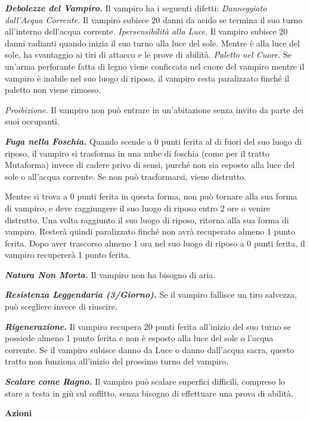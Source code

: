 \begin{multicols}{2}
\emph{\textbf{Debolezze del Vampiro.}} Il vampiro ha i seguenti difetti:
\emph{Danneggiato dall'Acqua Corrente.} Il vampiro subisce 20 danni da
acido se termina il suo turno all'interno dell'acqua corrente.
\emph{Ipersensibilità alla Luce.} Il vampiro subisce 20 danni radianti
quando inizia il suo turno alla luce del sole. Mentre è alla luce del
sole, ha svantaggio ai tiri di attacco e le prove di abilità.
\emph{Paletto nel Cuore.} Se un'arma perforante fatta di legno viene
conficcata nel cuore del vampiro mentre il vampiro è inabile nel suo
luogo di riposo, il vampiro resta paralizzato finché il paletto non
viene rimosso.

\emph{Proibizione.} Il vampiro non può entrare in un'abitazione senza
invito da parte dei suoi occupanti.

\emph{\textbf{Fuga nella Foschia.}} Quando scende a 0 punti ferita al di
fuori del suo luogo di riposo, il vampiro si trasforma in una nube di
foschia (come per il tratto Mutaforma) invece di cadere privo di sensi,
purché non sia esposto alla luce del sole o all'acqua corrente. Se non
può trasformarsi, viene distrutto.

Mentre si trova a 0 punti ferita in questa forma, non può tornare alla
sua forma di vampiro, e deve raggiungere il suo luogo di riposo entro 2
ore o venire distrutto. Una volta raggiunto il suo luogo di riposo,
ritorna alla sua forma di vampiro. Resterà quindi paralizzato finché non
avrà recuperato almeno 1 punto ferita. Dopo aver trascorso almeno 1 ora
nel suo luogo di riposo a 0 punti ferita, il vampiro recupererà 1 punto
ferita.

\emph{\textbf{Natura Non Morta.}} Il vampiro non ha bisogno di aria.

\emph{\textbf{Resistenza Leggendaria (3/Giorno).}} Se il vampiro
fallisce un tiro salvezza, può scegliere invece di riuscire.



\emph{\textbf{Rigenerazione.}} Il vampiro recupera 20 punti ferita
all'inizio del suo turno se possiede almeno 1 punto ferita e non è
esposto alla luce del sole o l'acqua corrente. Se il vampiro subisce
danno da Luce o danno dall'acqua sacra, questo tratto non funziona
all'inizio del prossimo turno del vampiro.

\emph{\textbf{Scalare come Ragno.}} Il vampiro può scalare superfici
difficili, compreso lo stare a testa in giù sul soffitto, senza bisogno
di effettuare una prova di abilità.

\textbf{Azioni}


\end{multicols}
